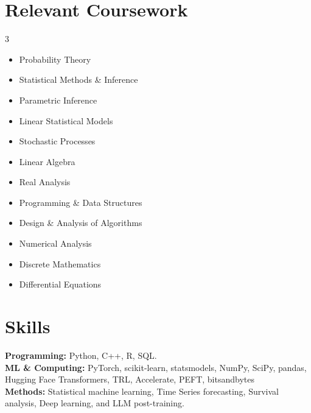 \documentclass[letterpaper,11pt]{article}
\begin{document}
\section{Relevant Coursework}
\begin{multicols}{3}
\small
\raggedcolumns
\begin{itemize}[itemsep=-4pt, parsep=4pt, topsep=0pt]
    \item Probability Theory
    \item Statistical Methods \& Inference
    \item Parametric Inference
    \item Linear Statistical Models
\end{itemize}
\columnbreak
\begin{itemize}[itemsep=-4pt, parsep=4pt, topsep=0pt]
    \item Stochastic Processes
    \item Linear Algebra
    \item Real Analysis
    \item Programming \& Data Structures
\end{itemize}
\columnbreak
\begin{itemize}[itemsep=-4pt, parsep=4pt, topsep=0pt]
    \item Design \& Analysis of Algorithms
    \item Numerical Analysis
    \item Discrete Mathematics
    \item Differential Equations
\end{itemize}
\end{multicols}
\vspace*{1.5\multicolsep}

%
\section{Skills}
 \begin{itemize}[leftmargin=0.15in, label={}]
    \small{\item{
     \textbf{Programming:} Python, C++, R, SQL.\\
     \textbf{ML \& Computing:} PyTorch, scikit-learn, statsmodels, NumPy, SciPy, pandas, Hugging Face Transformers, TRL, Accelerate, PEFT, bitsandbytes\\
     \textbf{Methods:} Statistical machine learning, Time Series forecasting, Survival analysis, Deep learning, and LLM post-training.\\
    }}
 \end{itemize}
 \vspace{-16pt}
\end{document}
